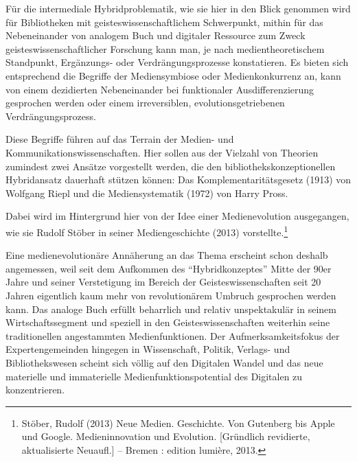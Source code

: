 \documentclass[a4paper,
fontsize=11pt,
oneside,
numbers=noperiodatend,
parskip=half-,
bibliography=totoc,
final
]{scrartcl}
\begin{document}
Für die intermediale Hybridproblematik, wie sie hier in den Blick
genommen wird für Bibliotheken mit geisteswissenschaftlichem
Schwerpunkt, mithin für das Nebeneinander von analogem Buch und
digitaler Ressource zum Zweck geisteswissenschaftlicher Forschung kann
man, je nach medientheoretischem Standpunkt, Ergänzungs- oder
Verdrängungsprozesse konstatieren. Es bieten sich entsprechend die
Begriffe der Mediensymbiose oder Medienkonkurrenz an, kann von einem
dezidierten Nebeneinander bei funktionaler Ausdifferenzierung gesprochen
werden oder einem irreversiblen, evolutionsgetriebenen
Verdrängungsprozess.

Diese Begriffe führen auf das Terrain der Medien- und
Kommunikationswissenschaften. Hier sollen aus der Vielzahl von Theorien
zumindest zwei Ansätze vorgestellt werden, die den
bibliothekskonzeptionellen Hybridansatz dauerhaft stützen können: Das
Komplementaritätsgesetz (1913) von Wolfgang Riepl und die
Mediensystematik (1972) von Harry Pross.

Dabei wird im Hintergrund hier von der Idee einer Medienevolution
ausgegangen, wie sie Rudolf Stöber in seiner Mediengeschichte (2013)
vorstellte.\footnote{Stöber, Rudolf (2013) Neue Medien. Geschichte. Von
  Gutenberg bis Apple und Google. Medieninnovation und Evolution.
  {[}Gründlich revidierte, aktualisierte Neuaufl.{]} -- Bremen : edition
  lumière, 2013.}

Eine medienevolutionäre Annäherung an das Thema erscheint schon deshalb
angemessen, weil seit dem Aufkommen des \enquote{Hybridkonzeptes} Mitte
der 90er Jahre und seiner Verstetigung im Bereich der
Geisteswissenschaften seit 20 Jahren eigentlich kaum mehr von
revolutionärem Umbruch gesprochen werden kann. Das analoge Buch erfüllt
beharrlich und relativ unspektakulär in seinem Wirtschaftssegment und
speziell in den Geisteswissenschaften weiterhin seine traditionellen
angestammten Medienfunktionen. Der Aufmerksamkeitsfokus der
Expertengemeinden hingegen in Wissenschaft, Politik, Verlags- und
Bibliothekswesen scheint sich völlig auf den Digitalen Wandel und das
neue materielle und immaterielle Medienfunktionspotential des Digitalen
zu konzentrieren.
\end{document}
